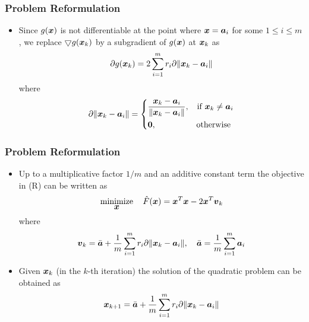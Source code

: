 \documentclass [t] {beamer} %
\begin{document}
\begin{frame} %
\frametitle{Problem Reformulation} 
\phantom{m}
\begin{itemize}
\item
Since  $g(\mbox{\boldmath$x$})$ is not differentiable at the point where $\mbox{\boldmath$x$} = \mbox{\boldmath$a$}_i$ for some $1 \leq i \leq m$,  we replace  $\bigtriangledown g(\mbox{\boldmath$x$}_k)$ by a subgradient of $g(\mbox{\boldmath$x$})$ at  $\mbox{\boldmath$x$}_k$  as
\begin{equation} 
\nonumber
\partial g{(\mbox{\boldmath$x$}_k)}  = 2 \sum^m_{i = 1} r_i \partial \|\mbox{\boldmath$x$}_k - \mbox{\boldmath$a$}_i\| 
\end{equation}
\mbox{where }
\begin{equation}
\nonumber
\partial \|\mbox{\boldmath$x$}_k - \mbox{\boldmath$a$}_i\|  = \left\{
	\begin{aligned}
	& \frac{\mbox{\boldmath$x$}_k - \mbox{\boldmath$a$}_i}{\|\mbox{\boldmath$x$}_k - \mbox{\boldmath$a$}_i\|}, &\mbox{if } \mbox{\boldmath$x$}_k \neq \mbox{\boldmath$a$}_i \\
	& \mbox{\boldmath{$0$}}, &\mbox{otherwise }
	\end{aligned}
\right.
\end{equation}
 
\end{itemize}
\end{frame}

\begin{frame} %
\frametitle{Problem Reformulation} 
\phantom{m}
\begin{itemize}
\item
Up to a multiplicative factor $1/m$ and an additive constant term the objective in (R) can  be written as 
\begin{equation}
\nonumber
\mathop{\mbox{minimize}}_{\mbox{\boldmath$x$}} \quad \hat{F}(\mbox{\boldmath$x$}) = \mbox{\boldmath$x$}^T\mbox{\boldmath$x$} - 2\mbox{\boldmath$x$}^T \mbox{\boldmath$v$}_k
\end{equation}
where
\begin{equation}
\begin{aligned}
\nonumber
\mbox{\boldmath$v$}_k  = \bar{\mbox{\boldmath$a$}} + \frac{1}{m} \sum^m_{i=1} r_i \partial \|\mbox{\boldmath$x$}_k - \mbox{\boldmath$a$}_i\| , \quad \bar{\mbox{\boldmath$a$}} = \frac{1}{m}  \sum^m_{i = 1} \mbox{\boldmath$a$}_i 
\end{aligned}
\end{equation}

\item
Given $\mbox{\boldmath$x$}_k$ (in the $k$-th iteration) the solution of the quadratic problem can be obtained as
\begin{equation} 
\nonumber
\mbox{\boldmath$x$}_{k+1} = \bar{\mbox{\boldmath$a$}} + \frac{1}{m} \sum^m_{i=1} r_i \partial \|\mbox{\boldmath$x$}_k - \mbox{\boldmath$a$}_i\|
\end{equation}
\end{itemize}
\end{frame}
\end{document}
